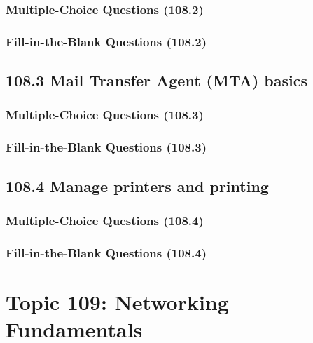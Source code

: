 \documentclass[a4paper]{report}
\begin{document}
\subsubsection*{Multiple-Choice Questions (108.2)}

\subsubsection*{Fill-in-the-Blank Questions (108.2)}

\subsection*{108.3 Mail Transfer Agent (MTA) basics}
\subsubsection*{Multiple-Choice Questions (108.3)}

\subsubsection*{Fill-in-the-Blank Questions (108.3)}

\subsection*{108.4 Manage printers and printing}
\subsubsection*{Multiple-Choice Questions (108.4)}

\subsubsection*{Fill-in-the-Blank Questions (108.4)}


\section*{Topic 109: Networking Fundamentals}
\end{document}
